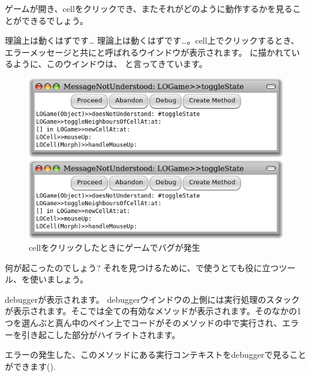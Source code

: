 \documentclass[a4paper,10pt,twoside]{book}
\begin{document}

ゲームが開き、cellをクリックでき、またそれがどのように動作するかを見ることができるでしょう。

理論上は動くはずです\ldots{}
理論上は動くはずです…。cell上でクリックするとき、エラーメッセージと共にと呼ばれるウインドウが表示されます。 に描かれているように、このウインドウは、 と言ってきています。

\begin{figure}[ht]
\ifluluelse
	{\centerline{\includegraphics[width=\textwidth]{Error}}}
	{\centerline{\includegraphics[scale=0.7]{Error}}}
\caption{cellをクリックしたときにゲームでバグが発生
}
\end{figure}

\noindent
何が起こったのでしょう? それを見つけるために、\st{}で使うとても役に立つツール、を使いましょう。

debuggerが表示されます。
debuggerウインドウの上側には実行処理のスタックが表示されます。そこでは全ての有効なメソッドが表示されます。そのなかの1つを選んぶと真ん中のペイン上で\st{}コードがそのメソッドの中で実行され、エラーを引き起こした部分がハイライトされます。

エラーの発生した、このメソッドにある実行コンテキストをdebuggerで見ることができます().
\end{document}
